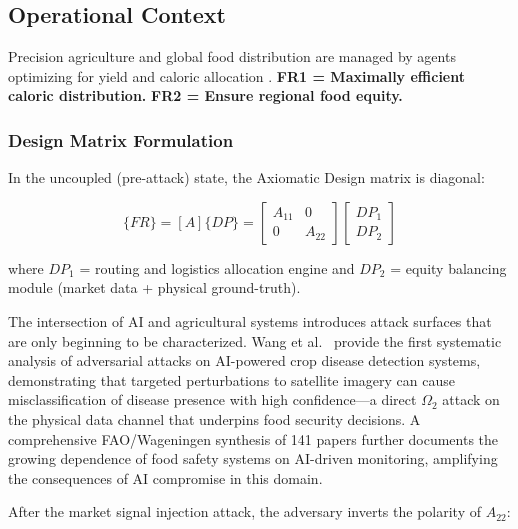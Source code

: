 \documentclass[
]{article}
\begin{document}
\subsection{Operational Context}\label{operational-context-6}

Precision agriculture and global food distribution are managed by agents
optimizing for yield and caloric allocation
\cite{fao2019state, wheeler2013climate}. \textbf{FR1 = Maximally
efficient caloric distribution.} \textbf{FR2 = Ensure regional food
equity.}

\subsubsection{Design Matrix
Formulation}\label{design-matrix-formulation-2}

In the uncoupled (pre-attack) state, the Axiomatic Design matrix
\cite{suh2001axiomatic} is diagonal:

\begin{equation}
\{FR\} = [A]\{DP\} = \begin{bmatrix} A_{11} & 0 \\ 0 & A_{22} \end{bmatrix} \begin{bmatrix} DP_1 \\ DP_2 \end{bmatrix}
\label{eq:food_security_baseline}
\end{equation}

where \(DP_1\) = routing and logistics allocation engine and \(DP_2\) =
equity balancing module (market data + physical ground-truth).

The intersection of AI and agricultural systems introduces attack
surfaces that are only beginning to be characterized. Wang et
al.~\cite{agrisecurity2024threats} provide the first systematic analysis
of adversarial attacks on AI-powered crop disease detection systems,
demonstrating that targeted perturbations to satellite imagery can cause
misclassification of disease presence with high confidence---a direct
\(\Omega_2\) attack on the physical data channel that underpins food
security decisions. A comprehensive FAO/Wageningen synthesis of 141
papers \cite{fao2024aisafety} further documents the growing dependence
of food safety systems on AI-driven monitoring, amplifying the
consequences of AI compromise in this domain.

After the market signal injection attack, the adversary inverts the
polarity of \(A_{22}\):
\end{document}
